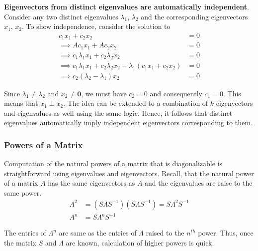 \documentclass[../../linear_algebra.tex]{subfiles}
\begin{document}
\textbf{Eigenvectors from distinct eigenvalues are automatically independent}. Consider any two distinct eigenvalues $\lambda_{1}$, $\lambda_{2}$ and the corresponding eigenvectors $x_{1}$, $x_{2}$. To show independence, consider the solution to
\begin{align*}
    c_{1}x_{1} + c_{2}x_{2} &= 0\\
    \implies Ac_{1}x_{1} + Ac_{2}x_{2} &= 0\\
    \implies c_{1}\lambda_{1}x_{1} + c_{2}\lambda_{2}x_{2} &= 0\\
    \implies c_{1}\lambda_{1}x_{1} + c_{2}\lambda_{2}x_{2} - \lambda_{1}(c_{1}x_{1} + c_{2}x_{2}) &= 0\\
    \implies c_{2}(\lambda_{2} - \lambda_{1})x_{2} &= 0
\end{align*}

Since $\lambda_{1} \neq \lambda_{2}$ and $x_{2} \neq \mathbf{0}$, we must have $c_{2} = 0$ and consequently $c_{1} = 0$. This means that $x_{1} \perp x_{2}$. The idea can be extended to a combination of $k$ eigenvectors and eigenvalues as well using the same logic. Hence, it follows that distinct eigenvalues automatically imply independent eigenvectors corresponding to them.

\subsubsection{Powers of a Matrix}
Computation of the natural powers of a matrix that is diagonalizable is straightforward using eigenvalues and eigenvectors. Recall, that the natural power of a matrix $A$ has the same eigenvectors as $A$ and the eigenvalues are raise to the same power.
\begin{align*}
    A^{2} &= (S \Lambda S^{-1})(S \Lambda S^{-1}) = S \Lambda^{2} S^{-1}\\
    A^{n} &= S \Lambda^{n} S^{-1}
\end{align*}

The entries of $\Lambda^{n}$ are same as the entries of $\Lambda$ raised to the $n^{th}$ power. Thus, once the matrix $S$ and $\Lambda$ are known, calculation of higher powers is quick.
\end{document}
